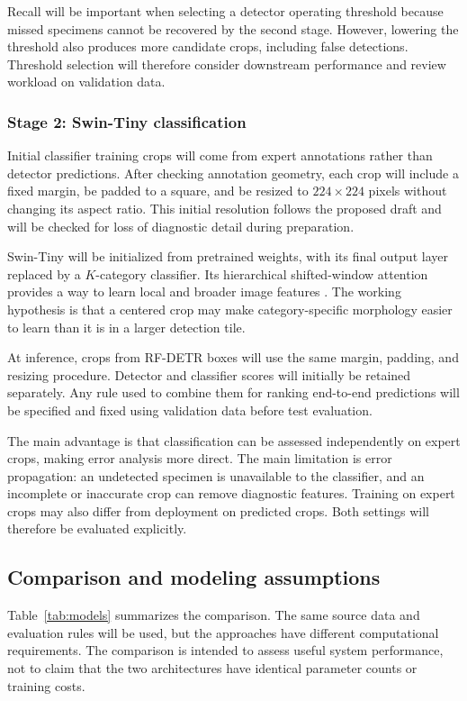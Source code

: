 \documentclass[11pt,letterpaper]{article}
\begin{document}
Recall will be important when selecting a detector operating threshold because missed specimens cannot be recovered by the second stage. However, lowering the threshold also produces more candidate crops, including false detections. Threshold selection will therefore consider downstream performance and review workload on validation data.

\subsubsection{Stage 2: Swin-Tiny classification}
Initial classifier training crops will come from expert annotations rather than detector predictions. After checking annotation geometry, each crop will include a fixed margin, be padded to a square, and be resized to $224\times224$ pixels without changing its aspect ratio. This initial resolution follows the proposed draft and will be checked for loss of diagnostic detail during preparation.

Swin-Tiny will be initialized from pretrained weights, with its final output layer replaced by a $K$-category classifier. Its hierarchical shifted-window attention provides a way to learn local and broader image features \citep{liu2021}. The working hypothesis is that a centered crop may make category-specific morphology easier to learn than it is in a larger detection tile.

At inference, crops from RF-DETR boxes will use the same margin, padding, and resizing procedure. Detector and classifier scores will initially be retained separately. Any rule used to combine them for ranking end-to-end predictions will be specified and fixed using validation data before test evaluation.

The main advantage is that classification can be assessed independently on expert crops, making error analysis more direct. The main limitation is error propagation: an undetected specimen is unavailable to the classifier, and an incomplete or inaccurate crop can remove diagnostic features. Training on expert crops may also differ from deployment on predicted crops. Both settings will therefore be evaluated explicitly.

\subsection{Comparison and modeling assumptions}
Table~\ref{tab:models} summarizes the comparison. The same source data and evaluation rules will be used, but the approaches have different computational requirements. The comparison is intended to assess useful system performance, not to claim that the two architectures have identical parameter counts or training costs.
\end{document}
